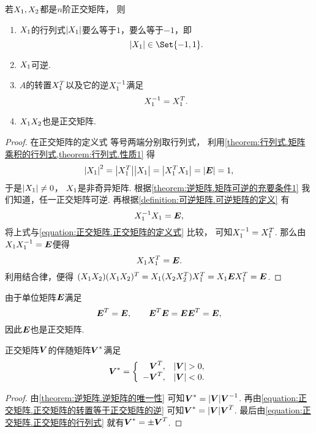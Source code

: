 \begin{property}
若\(X_1,X_2\)都是\(n\)阶正交矩阵，
则\begin{enumerate}
	\item \(X_1\)的行列式\(\abs{X_1}\)要么等于\(1\)，要么等于\(-1\)，即
	\begin{equation}\label{equation:正交矩阵.正交矩阵的行列式}
		\abs{\A}\in\Set{-1,1}.
	\end{equation}

	\item \(X_1\)可逆.

	\item \(A\)的转置\(X_1^T\)以及它的逆\(X_1^{-1}\)满足
	\begin{equation}\label{equation:正交矩阵.正交矩阵的转置等于正交矩阵的逆}
		X_1^{-1}=X_1^T.
	\end{equation}

	\item \(X_1X_2\)也是正交矩阵.
\end{enumerate}
\begin{proof}
在正交矩阵的定义式  等号两端分别取行列式，
利用\cref{theorem:行列式.矩阵乘积的行列式,theorem:行列式.性质1} 得\[
	\abs{X_1}^2
	=\abs{X_1^T}\abs{X_1\vphantom{^T}}
	=\abs{X_1^TX_1}
	=\abs{\boldsymbol{E}}
	=1,
\]
于是\(\abs{X_1}\neq0\)，
\(X_1\)是非奇异矩阵.
根据\cref{theorem:逆矩阵.矩阵可逆的充要条件1} 我们知道，任一正交矩阵可逆.
再根据\cref{definition:可逆矩阵.可逆矩阵的定义} 有\[
	X_1^{-1}X_1=\boldsymbol{E},
\]
将上式与\cref{equation:正交矩阵.正交矩阵的定义式} 比较，
可知\(X_1^{-1}=X_1^T\).
那么由\(X_1X_1^{-1}=\boldsymbol{E}\)便得\[
	X_1X_1^T=\boldsymbol{E}.
\]
利用结合律，便得
\((X_1X_2)(X_1X_2)^T
= X_1(X_2X_2^T)X_1^T
= X_1\boldsymbol{E}X_1^T
= \boldsymbol{E}\).
\end{proof}
\end{property}

\begin{example}
由于单位矩阵\(\boldsymbol{E}\)满足\[
	\boldsymbol{E}^T=\boldsymbol{E}, \qquad
	\boldsymbol{E}^T \boldsymbol{E} = \boldsymbol{E} \boldsymbol{E}^T = \boldsymbol{E},
\]
因此\(\boldsymbol{E}\)也是正交矩阵.
\end{example}

\begin{proposition}
正交矩阵\(\Q\)的伴随矩阵\(\Q^*\)满足\[
	\Q^*
	= \left\{ \begin{array}{rc}
		\Q^T, & \abs{\Q}>0, \\
		-\Q^T, & \abs{\Q}<0.
	\end{array} \right.
\]
\begin{proof}
由\cref{theorem:逆矩阵.逆矩阵的唯一性}
可知\(\Q^* = \abs{\Q} \Q^{-1}\).
再由\cref{equation:正交矩阵.正交矩阵的转置等于正交矩阵的逆}
可知\(\Q^* = \abs{\Q} \Q^T\).
最后由\cref{equation:正交矩阵.正交矩阵的行列式}
就有\(\Q^* = \pm\Q^T\).
\end{proof}
\end{proposition}

